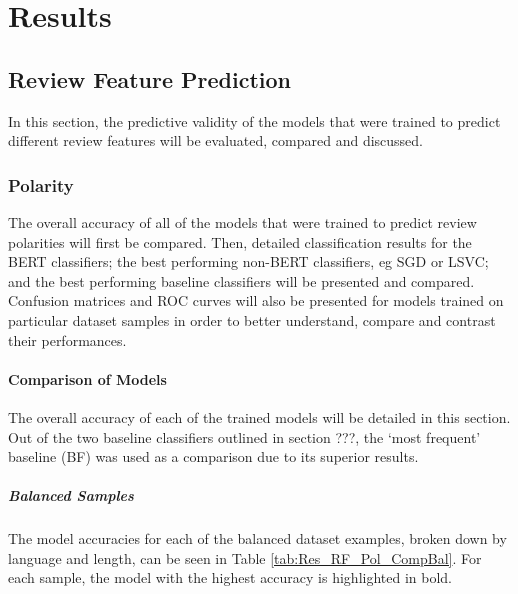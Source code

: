 \chapter{Results} \label{sec:Res}

\section{Review Feature Prediction} \label{sec:Res_RF}

In this section, the predictive validity of the models that were trained to predict different review features will be evaluated, compared and discussed.

\subsection{Polarity} \label{sec:Res_RF_Pol}

The overall accuracy of all of the models that were trained to predict review polarities will first be compared. Then, detailed classification results for the BERT classifiers; the best performing non-BERT classifiers, eg SGD or LSVC; and the best performing baseline classifiers will be presented and compared. Confusion matrices and ROC curves will also be presented for models trained on particular dataset samples in order to better understand, compare and contrast their performances.

\subsubsection{Comparison of Models}

The overall accuracy of each of the trained models will be detailed in this section. Out of the two baseline classifiers outlined in section ???, the `most frequent' baseline (BF) was used as a comparison due to its superior results.

\paragraph{Balanced Samples}

The model accuracies for each of the balanced dataset examples, broken down by language and length, can be seen in Table \ref{tab:Res_RF_Pol_CompBal}. For each sample, the model with the highest accuracy is highlighted in bold.

